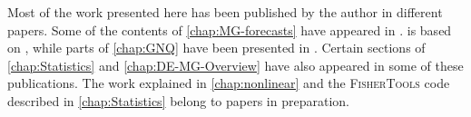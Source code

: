 Most of the work presented here has been published by the author in different papers. Some of the contents
of \cref{chap:MG-forecasts} have appeared in \cite{casas_linear_non}.  is based
on \cite{casas_fitting_2015}, while parts of \cref{chap:GNQ} have been presented in \cite{casas_dynamics_2016}.
Certain sections of \cref{chap:Statistics} and \cref{chap:DE-MG-Overview} have also appeared in some of these publications.
The work explained in \cref{chap:nonlinear} and the \textsc{FisherTools} code described in \cref{chap:Statistics}
belong to papers in preparation.


%
%







 